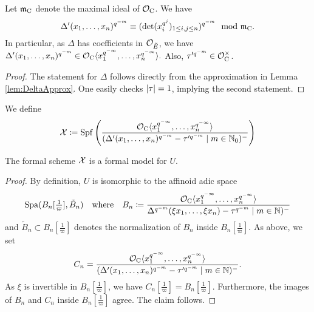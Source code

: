 \documentclass[../main.tex]{subfiles}
\begin{document}
\begin{lem}\label{lem:PropsOfDeltaPrAndTauPr}
  Let $\mathfrak{m}_{\mathrm{C}}$ denote the maximal ideal of $\mathcal{O}_{\mathrm{C}}$. We have
  \begin{equation*}
    \Delta'(x_1, \dots, x_n)^{q^{-m}} \equiv (\det(x_i^{q^j})_{1 \leq i,j \leq
    n})^{q^{-m}} \mod {\mathfrak{m}}_{\mathrm{C}}.
  \end{equation*}
  In particular, as $\Delta$ has coefficients in $\mathcal{O}_{\breve {E}}$, we have 
  $\Delta'(x_1, \dots, x_n)^{q^{-m}} \in \mathcal{O}_{\mathrm{C}} \langle x_1^{q^{-\infty}}, \dots
  , x_n^{q^{-\infty}}\rangle.$
  Also, $\tau'^{q^{-m}} \in \mathcal{O}_{\mathrm{C}}^\times$. 
\begin{proof}
  The statement for $\Delta$ follows directly from the approximation in Lemma
  \ref{lem:DeltaApprox}. One easily checks $\lvert \tau \rvert = 1$, implying the second
  statement.
\end{proof}
\end{lem}

We define 
\begin{equation*}
  \mathcal{X} \coloneq \operatorname{Spf} \left(
    \frac
    {\mathcal{O}_{\mathrm{C}} \langle x_1^{q^{-\infty}}, \dots , x_n^{q^{-\infty}}
      \rangle}
    {(\Delta'(x_1, \dots, x_n)^{q^{-m}} - \tau'^{q^{-m}} \mid m \in \mathbb{N}_0)^-
      }\right)
\end{equation*}

\begin{prop}\label{prop:AffinoidIsFormalModel}
  The formal scheme $\mathcal{X}$ is a formal model for $U$. 
\end{prop}
\begin{proof} 
  By definition, $U$ is isomorphic to the affinoid adic space
  \begin{equation*}
    \operatorname{Spa}(B_n[\tfrac 1\varpi], \tilde B_n) \quad \text{where} \quad 
    B_n \coloneqq \frac{\mathcal{O}_{\mathrm{C}} \langle x_1^{q^{-\infty}}, \dots,
    x_n^{q^{-\infty}} \rangle}
    {\Delta^{q^{-m}}(\xi x_1, \dots, \xi x_n) - \tau^{q^{-m}} \mid m \in \mathbb{N})^-}
  \end{equation*}
  and $\tilde B_n \subset B_n[\tfrac 1\varpi]$ denotes the normalization of 
  $B_n$ inside $B_n[\tfrac 1 \varpi]$. 
  As above, we set 
  $$C_n = \frac{\mathcal{O}_{\mathrm{C}} \langle x_1^{q^{-\infty}}, \dots,
  x_n^{q^{-\infty}} \rangle} {(\Delta'(x_1, \dots, x_n)^{q^{-m}} -
  \tau'^{q^{-m}} \mid m \in \mathbb{N})^-}.$$
  As $\xi$ is invertible in $B_n[\tfrac 1 \varpi]$, we have 
  $C_n[\tfrac 1 \varpi] = B_n[\tfrac 1 \varpi]$. Furthermore, the images of 
  $B_n$ and $C_n$ inside $B_n[\tfrac 1 \varpi]$ agree. The claim follows.
\end{proof}
\end{document}
